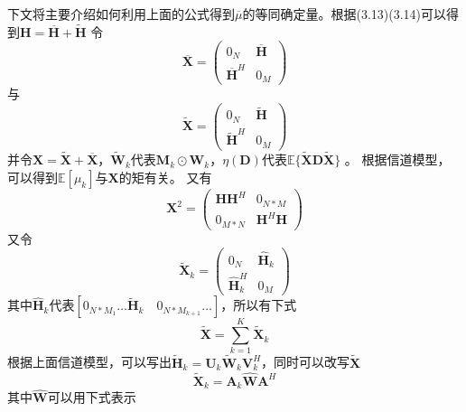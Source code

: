 \documentclass[bachelor,nocolorlinks, printoneside]{seuthesis} %
\begin{document}
\begin{Main}
下文将主要介绍如何利用上面的公式得到$\overline{\mu}$的等同确定量。根据(3.13)(3.14)可以得到$\mathbf{H} = \overline{\mathbf{H}} + \tilde{\mathbf{H}}$
令
\begin{equation}\label{key}
\overline{\mathbf{X}} = \left(
\begin{array}{cc}
0_N & \overline{\mathbf{H}} \\
\overline{\mathbf{H}}^H & 0_M
\end{array}
\right)
\end{equation}
与
\begin{equation}\label{key}
\tilde{\mathbf{X}} = \left(
\begin{array}{cc}
0_N & \tilde{\mathbf{H}} \\
\tilde{\mathbf{H}}^H & 0_M
\end{array}
\right)
\end{equation}
并令$\mathbf{X} = \tilde{\mathbf{X}} + \overline{\mathbf{X}}$，$\tilde{\mathbf{W}}_k$代表$\mathbf{M}_k \odot \mathbf{W}_k$，$\eta(\mathbf{D})$代表$\mathbb{E}\lbrace \tilde{\mathbf{X}} \mathbf{D} \tilde{\mathbf{X}} \rbrace $ 。 根据信道模型，可以得到$\mathbb{E}[\mu_k]$与$\mathbf{X}$的矩有关。
又有
\begin{equation}\label{key}
\mathbf{X}^2 = \left(
\begin{array}{cc}
\mathbf{H}\mathbf{H}^H & 0_{N*M} \\
0_{M*N} & \mathbf{H}^H\mathbf{H}
\end{array}
\right)
\end{equation}
又令
\begin{equation}\label{key}
\tilde{\mathbf{X}}_k = 
\left(
\begin{array}{cc}
0_N & \hat{\mathbf{H}}_k \\
\hat{\mathbf{H}}^H_k & 0_M
\end{array}
\right)
\end{equation}
其中$\hat{\mathbf{H}}_k$代表$[ 0_{N*M_1} \ldots \tilde{\mathbf{H}}_k \quad 0_{N*M_{k+1}} \ldots]$，所以有下式
\begin{equation}\label{key}
\tilde{\mathbf{X}} = \sum_{k=1}^{K} \tilde{\mathbf{X}}_k
\end{equation}
根据上面信道模型，可以写出$\tilde{\mathbf{H}}_k = \mathbf{U}_k \tilde{\mathbf{W}}_k \mathbf{V}_k^H$，同时可以改写$\tilde{\mathbf{X}}$
\begin{equation}\label{key}
\tilde{\mathbf{X}}_k = \mathbf{A}_k \hat{\mathbf{W}} \mathbf{A}^H
\end{equation}
其中$\hat{\mathbf{W}}$可以用下式表示
\begin{equation}\label{key}

\end{equation}
\end{Main}
\end{document}

